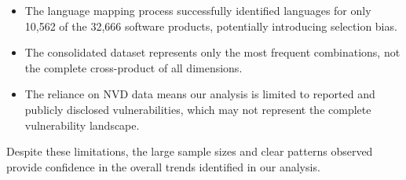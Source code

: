 \begin{itemize}
    \item The language mapping process successfully identified languages for only 10,562 of the 32,666 software products, potentially introducing selection bias.
    \item The consolidated dataset represents only the most frequent combinations, not the complete cross-product of all dimensions.
    \item The reliance on NVD data means our analysis is limited to reported and publicly disclosed vulnerabilities, which may not represent the complete vulnerability landscape.
\end{itemize}

Despite these limitations, the large sample sizes and clear patterns observed provide confidence in the overall trends identified in our analysis.